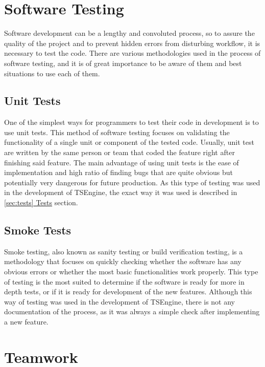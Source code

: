 \newpage
\section{Software Testing}
\label{sec:testing}
\hspace{\parindent}
Software development can be a lengthy and convoluted process, so to assure the quality of the project and to prevent hidden errors from disturbing workflow, it is necessary to test the code. There are various methodologies used in the process of software testing, and it is of great importance to be aware of them and best situations to use each of them.
\subsection{Unit Tests}
\hspace{\parindent}
One of the simplest ways for programmers to test their code in development is to use unit tests. This method of software testing focuses on validating the functionality of a single unit or component of the tested code. Usually, unit test are written by the same person or team that coded the feature right after finishing said feature. The main advantage of using unit tests is the ease of implementation and high ratio of finding bugs that are quite obvious but potentially very dangerous for future production. As this type of testing was used in the development of TSEngine, the exact way it was used is described in \hyperref[sec:tests]{\ref*{sec:tests} Tests} section.

\subsection{Smoke Tests}
\hspace{\parindent}
Smoke testing, also known as sanity testing or build verification testing, is a methodology that focuses on quickly checking whether the software has any obvious errors or whether the most basic functionalities work properly. This type of testing is the most suited to determine if the software is ready for more in depth tests, or if it is ready for development of the new features. Although this way of testing was used in the development of TSEngine, there is not any documentation of the process, as it was always a simple check after implementing a new feature.

\newpage
\section{Teamwork}
\label{sec:teamwork}
\hspace{\parindent} %

